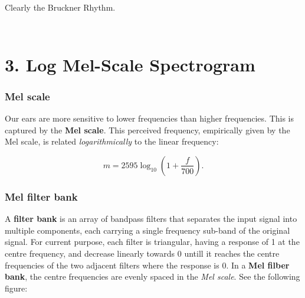\documentclass[11pt]{article}
\makeatletter
\newcommand{\boxspacing}{\kern\kvtcb@left@rule\kern\kvtcb@boxsep}
\newcommand{\prompt}[4]{
        {\ttfamily\llap{{\color{#2}[#3]:\hspace{3pt}#4}}\vspace{-\baselineskip}}
    }
\makeatother
\begin{document}
    Clearly the Bruckner Rhythm.

    \begin{tcolorbox}[breakable, size=fbox, boxrule=1pt, pad at break*=1mm,colback=cellbackground, colframe=cellborder]
\prompt{In}{incolor}{ }{\boxspacing}
\begin{Verbatim}[commandchars=\\\{\}]

\end{Verbatim}
\end{tcolorbox}

    \begin{tcolorbox}[breakable, size=fbox, boxrule=1pt, pad at break*=1mm,colback=cellbackground, colframe=cellborder]
\prompt{In}{incolor}{ }{\boxspacing}
\begin{Verbatim}[commandchars=\\\{\}]

\end{Verbatim}
\end{tcolorbox}

    \hypertarget{log-mel-scale-spectrogram}{%
\section{3. Log Mel-Scale Spectrogram}\label{log-mel-scale-spectrogram}}

\hypertarget{mel-scale}{%
\subsubsection{Mel scale}\label{mel-scale}}

Our ears are more sensitive to lower frequencies than higher
frequencies. This is captured by the \textbf{Mel scale}. This perceived
frequency, empirically given by the Mel scale, is related
\emph{logarithmically} to the linear frequency:

\[m = 2595 \log_{10}{\left( 1+ \frac{f}{700} \right)}.\tag{7}\]

\hypertarget{mel-filter-bank}{%
\subsubsection{Mel filter bank}\label{mel-filter-bank}}

A \textbf{filter bank} is an array of bandpass filters that separates
the input signal into multiple components, each carrying a single
frequency sub-band of the original signal. For current purpose, each
filter is triangular, having a response of 1 at the centre frequency,
and decrease linearly towards 0 untill it reaches the centre frequencies
of the two adjacent filters where the response is 0. In a \textbf{Mel
filber bank}, the centre frequencies are evenly spaced in the \emph{Mel
scale}. See the following figure:
\end{document}
